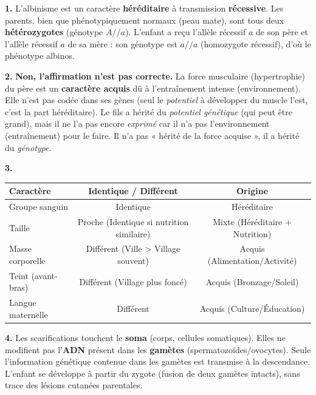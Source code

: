 \documentclass[11pt]{article}
\begin{document}
\begin{corrige}
\textbf{1.} L'albinisme est un caractère \textbf{héréditaire} à transmission \textbf{récessive}. Les parents, bien que phénotypiquement normaux (peau mate), sont tous deux \textbf{hétérozygotes} (génotype $A//a$). L'enfant a reçu l'allèle récessif $a$ de son père et l'allèle récessif $a$ de sa mère : son génotype est $a//a$ (homozygote récessif), d'où le phénotype albinos.
\par\textbf{2.} \textbf{Non, l'affirmation n'est pas correcte.} La force musculaire (hypertrophie) du père est un \textbf{caractère acquis} dû à l'entraînement intense (environnement). Elle n'est pas codée dans ses gènes (seul le \emph{potentiel} à développer du muscle l'est, c'est la part héréditaire). Le fils a hérité du \emph{potentiel génétique} (qui peut être grand), mais il ne l'a pas encore \emph{exprimé} car il n'a pas l'environnement (entraînement) pour le faire. Il n'a pas « hérité de la force acquise », il a hérité du \emph{génotype}.
\par\textbf{3.}
\begin{center}
\begin{tabular}{|l|c|c|}\hline
\textbf{Caractère} & \textbf{Identique / Différent} & \textbf{Origine} \\ \hline
Groupe sanguin & Identique & Héréditaire \\ \hline
Taille & Proche (Identique si nutrition similaire) & Mixte (Héréditaire + Nutrition) \\ \hline
Masse corporelle & Différent (Ville > Village souvent) & Acquis (Alimentation/Activité) \\ \hline
Teint (avant-bras) & Différent (Village plus foncé) & Acquis (Bronzage/Soleil) \\ \hline
Langue maternelle & Différent & Acquis (Culture/Éducation) \\ \hline
\end{tabular}
\end{center}
\par\textbf{4.} Les scarifications touchent le \textbf{soma} (corps, cellules somatiques). Elles ne modifient pas l'\textbf{ADN} présent dans les \textbf{gamètes} (spermatozoïdes/ovocytes). Seule l'information génétique contenue dans les gamètes est transmise à la descendance. L'enfant se développe à partir du zygote (fusion de deux gamètes intacts), sans trace des lésions cutanées parentales.
\end{corrige}
\end{document}
